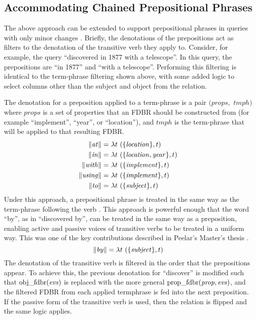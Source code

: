 \documentclass[../main.tex]{subfiles}
\begin{document}
\begin{refsection}
\subsection{Accommodating Chained Prepositional Phrases}

The above approach can be extended to support prepositional phrases in queries with only minor changes \cite{peelar2016accommodating, frost2013event}. Briefly, the denotations of the prepositions act as filters to the denotation of the transitive verb they apply to.  Consider, for example, the query ``discovered in 1877 with a telescope''.  In this query, the prepositions are ``in 1877'' and ``with a telescope''.  Performing this filtering is identical to the term-phrase filtering shown above, with some added logic to select columns other than the subject and object from the relation.

The denotation for a preposition applied to a term-phrase is a pair  $(\mathit{props},$ $\mathit{tmph})$ where $\mathit{props}$ is a set of properties that an FDBR should be constructed from (for example ``implement'', ``year'', or ``location''), and $\mathit{tmph}$ is the term-phrase that will be applied to that resulting FDBR.
\begin{equation*}
	\begin{split}
		\meaningof{\mathit{at}} =&\ \lambda t\ (\{\mathit{location}\}, t) \\
		\meaningof{\mathit{in}} =&\ \lambda t\ (\{{\mathit{location}}, {\mathit{year}}\}, t) \\
		\meaningof{\mathit{with}} =&\ \lambda t\ (\{\mathit{implement}\}, t) \\
		\meaningof{\mathit{using}} =&\ \lambda t\ (\{\mathit{implement}\}, t) \\
		\meaningof{\mathit{to}} =&\ \lambda t\ (\{\mathit{subject}\}, t)
	\end{split}
\end{equation*}
Under this approach, a prepositional phrase is treated in the same way as the term-phrase following the verb \cite{peelar2016accommodating}.
This approach is powerful enough that the word ``by'', as in ``discovered by'', can be treated in the same way as a preposition, enabling active and passive voices of transitive verbs to be treated in a uniform way.  This was one of the key contributions described in Peelar's Master's thesis \cite{peelar2016accommodating}.
\[
\meaningof{\mathit{by}} = \lambda t\ (\{\mathit{subject}\}, t)
\]
The denotation of the transitive verb is filtered in the order that the prepositions appear.  To achieve this, the previous denotation for ``discover'' is modified such that $\mathrm{obj\_fdbr}(\mathit{evs})$ is replaced with the more general $\mathrm{prop\_fdbr}(\mathit{prop, evs})$, and the filtered FDBR from each applied termphrase is fed into the next preposition.  If the passive form of the transitive verb is used, then the relation is flipped and the same logic applies.


\end{refsection}
\end{document}
